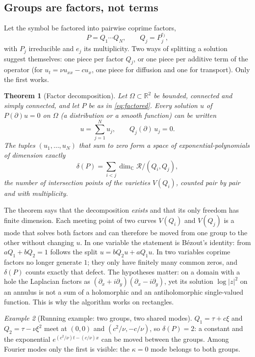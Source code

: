 \documentclass[11pt]{article}
\theoremstyle{plain}
\newtheorem{theorem}{Theorem}[section]
\theoremstyle{definition}
\theoremstyle{remark}
\newtheorem{example}[theorem]{Example}
\newcommand{\R}{\mathbb{R}}
\newcommand{\C}{\mathbb{C}}
\newcommand{\ring}{\mathcal{R}}            %
\newcommand{\Var}{V}                        %
\newcommand{\deltaP}{\delta(P)}             %
\newcommand{\abs}[1]{\lvert#1\rvert}
\begin{document}
\subsection{Groups are factors, not terms}\label{sec:factor}
Let the symbol be factored into pairwise coprime factors,
\begin{equation}\label{eq:factored}
  P=Q_1\cdots Q_N,\qquad Q_j=P_j^{e_j},
\end{equation}
with $P_j$ irreducible and $e_j$ its multiplicity. Two ways of splitting a solution suggest themselves: one piece per
factor $Q_j$, or one piece per additive term of the operator (for $u_t=\nu u_{xx}-cu_x$, one piece for diffusion and one
for transport). Only the first works.

\begin{theorem}[Factor decomposition]\label{thm:factor}
Let $\Omega\subset\R^2$ be bounded, connected and simply connected, and let $P$ be as in \eqref{eq:factored}. Every
solution $u$ of $P(\partial)u=0$ on $\Omega$ (a distribution or a smooth function) can be written
\begin{equation}\label{eq:split}
  u=\sum_{j=1}^Nu_j,\qquad Q_j(\partial)\,u_j=0 .
\end{equation}
The tuples $(u_1,\dots,u_N)$ that sum to zero form a space of exponential-polynomials of dimension exactly
\begin{equation}\label{eq:delta}
  \deltaP=\sum_{i<j}\dim_\C\ring/(Q_i,Q_j),
\end{equation}
the number of intersection points of the varieties $\Var(Q_i)$, counted pair by pair and with multiplicity.
\end{theorem}

The theorem says that the decomposition \emph{exists} and that its only freedom has finite dimension. Each meeting point
of two curves $\Var(Q_i)$ and $\Var(Q_j)$ is a mode that solves both factors and can therefore be moved from one group to
the other without changing $u$. In one variable the statement is B\'ezout's identity: from $aQ_1+bQ_2=1$
follows the split $u=bQ_2u+aQ_1u$. In two variables coprime factors no longer generate $1$; they only have finitely many common
zeros, and $\deltaP$ counts exactly that defect. The hypotheses matter: on a domain with a hole the Laplacian factors as
$(\partial_x+i\partial_y)(\partial_x-i\partial_y)$, yet its solution $\log\abs{z}^2$ on an annulus is not a sum of a
holomorphic and an antiholomorphic single-valued function. This is why the algorithm works on rectangles.

\begin{example}[Running example: two groups, two shared modes]\label{ex:delta}
$Q_1=\tau+c\xi$ and $Q_2=\tau-\nu\xi^2$ meet at $(0,0)$ and $(c^2/\nu,-c/\nu)$, so $\deltaP=2$: a constant and the
exponential $e^{(c^2/\nu)t-(c/\nu)x}$ can be moved between the groups. Among Fourier modes only the first is visible:
the $\kappa=0$ mode belongs to both groups.
\end{example}
\end{document}
